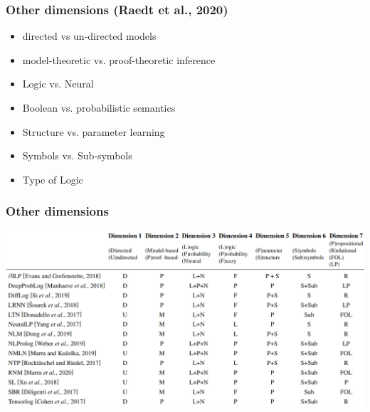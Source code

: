 \documentclass{beamer}
\begin{document}
\begin{frame}
  \frametitle{Other dimensions (Raedt et al., 2020)}
  \begin{itemize}
  \item directed vs un-directed models
  \item model-theoretic vs. proof-theoretic inference
  \item Logic vs. Neural
  \item Boolean vs. probabilistic semantics
  \item Structure vs. parameter learning
  \item Symbols vs. Sub-symbols
  \item Type of Logic
  \end{itemize}
\end{frame}

\begin{frame}
  \frametitle{Other dimensions}
  \centering
  \includegraphics[width=1\textwidth]{im3.png}
\end{frame}
\end{document}
